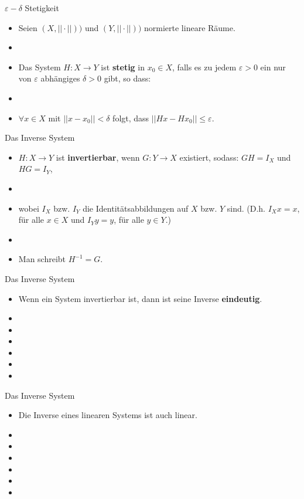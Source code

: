 \documentclass[14pt, aspectratio=169, handout]{beamer}
\begin{document}
\begin{frame}{$\varepsilon-\delta$ Stetigkeit}
    \begin{itemize}
        \item Seien $(X, ||\cdot||))$ und $(Y, ||\cdot||))$ normierte lineare Räume.
        \item[] 
        \item[] Das System $H:X \to Y$ ist \textbf{stetig} in $x_0 \in X$, falls es zu jedem $\varepsilon > 0$ ein nur von $\varepsilon$ abhängiges $\delta >0$ gibt, so dass:
        \item[] 
        \item[] $\forall x\in X$ mit $||x-x_0||<\delta$ folgt, dass $||Hx-Hx_0||\leq \varepsilon$.
    \end{itemize}
\end{frame}

\begin{frame}{Das Inverse System}
    \begin{itemize}
        \item $H:X \to Y$ ist \textbf{invertierbar}, wenn $G:Y \to X$ existiert, sodass: $GH = I_X$ und $HG = I_Y$, 
        \item[] 
        \item[] wobei $I_X$ bzw. $I_Y$ die Identitätsabbildungen auf $X$ bzw. $Y$ sind. (D.h. $I_X x = x$, für alle $x\in X$ und $I_Y y= y$, für alle $y \in Y$.) 
        \item[] 
        \item Man schreibt $H^{-1} = G$.
    \end{itemize}
\end{frame}

\begin{frame}{Das Inverse System}
    \begin{itemize}
        \item Wenn ein System invertierbar ist, dann ist seine Inverse \textbf{eindeutig}.
        \item[] 
        \item[]
        \item[] 
        \item[]
        \item[] 
        \item[]
    \end{itemize}
\end{frame}

\begin{frame}{Das Inverse System}
    \begin{itemize}
        \item Die Inverse eines linearen Systems ist auch linear.
        \item[] 
        \item[]
        \item[] 
        \item[]
        \item[] 
        \item[]
    \end{itemize}
\end{frame}
\end{document}
